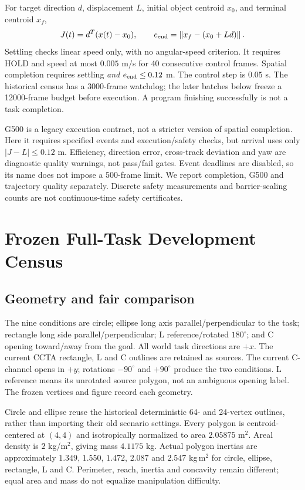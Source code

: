 \documentclass[letterpaper,10pt,conference]{ieeeconf}
\newcommand{\norm}[1]{\left\lVert#1\right\rVert}
\begin{document}
For target direction $d$, displacement $L$, initial object centroid $x_0$, and terminal centroid $x_f$,
\begin{equation}
J(t)=d^T(x(t)-x_0),\qquad
e_{\rm end}=\norm{x_f-(x_0+Ld)}.
\end{equation}
Settling checks linear speed only, with no angular-speed criterion. It requires HOLD and speed at most $0.005$ m/s for 40 consecutive control frames. Spatial completion requires settling \emph{and} $e_{\rm end}\leq0.12$ m. The control step is $0.05$ s. The historical census has a 3000-frame watchdog; the later batches below freeze a 12000-frame budget before execution. A program finishing successfully is not a task completion.

G500 is a legacy execution contract, not a stricter version of spatial completion. Here it requires specified events and execution/safety checks, but arrival uses only $|J-L|\leq0.12$ m. Efficiency, direction error, cross-track deviation and yaw are diagnostic quality warnings, not pass/fail gates. Event deadlines are disabled, so its name does not impose a 500-frame limit. We report completion, G500 and trajectory quality separately. Discrete safety measurements and barrier-scaling counts are not continuous-time safety certificates.

\section{Frozen Full-Task Development Census}
\subsection{Geometry and fair comparison}
The nine conditions are circle; ellipse long axis parallel/perpendicular to the task; rectangle long side parallel/perpendicular; L reference/rotated $180^\circ$; and C opening toward/away from the goal. All world task directions are $+x$. The current CCTA rectangle, L and C outlines are retained as sources. The current C-channel opens in $+y$; rotations $-90^\circ$ and $+90^\circ$ produce the two conditions. L reference means its unrotated source polygon, not an ambiguous opening label. The frozen vertices and figure record each geometry.

Circle and ellipse reuse the historical deterministic 64- and 24-vertex outlines, rather than importing their old scenario settings. Every polygon is centroid-centered at $(4,4)$ and isotropically normalized to area $2.05875$ m$^2$. Areal density is $2$ kg/m$^2$, giving mass $4.1175$ kg. Actual polygon inertias are approximately $1.349$, $1.550$, $1.472$, $2.087$ and $2.547$ kg\,m$^2$ for circle, ellipse, rectangle, L and C. Perimeter, reach, inertia and concavity remain different; equal area and mass do not equalize manipulation difficulty.
\end{document}

